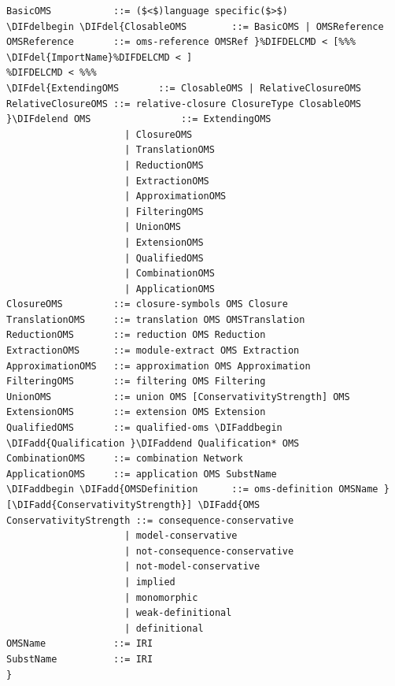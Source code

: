 \documentclass[10pt,fleqn,final]{scrreprt}
\newenvironment{definitions}[0]{\medskip }{}
\providecommand{\DIFadd}[1]{{\protect\color{blue}\uwave{#1}}} %
\providecommand{\DIFdel}[1]{{\protect\color{red}\sout{#1}}}                      %
\providecommand{\DIFaddbegin}{} %
\providecommand{\DIFaddend}{} %
\providecommand{\DIFdelbegin}{} %
\providecommand{\DIFdelend}{} %
\begin{document}
\begin{definitions}
\begin{lstlisting}[language=ebnf,escapeinside={()}]
BasicOMS           ::= ($<$)language specific($>$) 
\DIFdelbegin \DIFdel{ClosableOMS        ::= BasicOMS | OMSReference
OMSReference       ::= oms-reference OMSRef }%DIFDELCMD < [%%%
\DIFdel{ImportName}%DIFDELCMD < ]
%DIFDELCMD < %%%
\DIFdel{ExtendingOMS       ::= ClosableOMS | RelativeClosureOMS
RelativeClosureOMS ::= relative-closure ClosureType ClosableOMS
}\DIFdelend OMS                ::= ExtendingOMS
                     | ClosureOMS
                     | TranslationOMS
                     | ReductionOMS
                     | ExtractionOMS
                     | ApproximationOMS
                     | FilteringOMS
                     | UnionOMS
                     | ExtensionOMS
                     | QualifiedOMS
                     | CombinationOMS
                     | ApplicationOMS
ClosureOMS         ::= closure-symbols OMS Closure
TranslationOMS     ::= translation OMS OMSTranslation
ReductionOMS       ::= reduction OMS Reduction
ExtractionOMS      ::= module-extract OMS Extraction
ApproximationOMS   ::= approximation OMS Approximation
FilteringOMS       ::= filtering OMS Filtering
UnionOMS           ::= union OMS [ConservativityStrength] OMS
ExtensionOMS       ::= extension OMS Extension
QualifiedOMS       ::= qualified-oms \DIFaddbegin \DIFadd{Qualification }\DIFaddend Qualification* OMS
CombinationOMS     ::= combination Network
ApplicationOMS     ::= application OMS SubstName
\DIFaddbegin \DIFadd{OMSDefinition      ::= oms-definition OMSName }[\DIFadd{ConservativityStrength}] \DIFadd{OMS
ConservativityStrength ::= consequence-conservative
                     | model-conservative
                     | not-consequence-conservative
                     | not-model-conservative
                     | implied
                     | monomorphic
                     | weak-definitional
                     | definitional
OMSName            ::= IRI
SubstName          ::= IRI
}\end{lstlisting}


\end{definitions}
\end{document}
